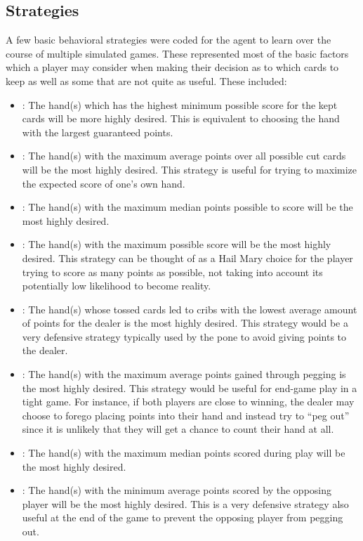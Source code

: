 
\subsection{Strategies}
\label{sec:dm-methods-strategies}


A few basic behavioral strategies were coded for the agent to learn
over the course of multiple simulated games.
%
These represented most of the basic factors which a player may consider when
making their decision as to which cards to keep
as well as some that are not quite as useful.
%
These included:
\begin{itemize}
\item \handmaxmin:
	The hand(s) which has the highest minimum possible score for the kept cards
	will be more highly desired.
	This is equivalent to choosing the hand with the largest guaranteed points.
\item \handmaxavg:
	The hand(s) with the maximum average points over all possible cut cards will
	be the most highly desired.
	This strategy is useful for trying to maximize the expected score of one's
	own hand.
\item \handmaxmed:
	The hand(s) with the maximum median points possible to score will be the most
	highly desired.
\item \handmaxposs:
	The hand(s) with the maximum possible score will be the most highly desired.
	This strategy can be thought of as a Hail Mary choice for the player trying
	to score as many points as possible, not taking into account its
	potentially low likelihood to become reality.
\item \cribminavg:
	The hand(s) whose tossed cards led to cribs with the lowest average amount
	of points for the dealer is
	the most highly desired.
	This strategy would be a very defensive strategy typically used by the pone
	to avoid giving points to the dealer.
\item \peggingmaxavggained:
	The hand(s) with the maximum average points gained through pegging is the most
	highly desired.
	This strategy would be useful for end-game play in a tight game.
	For instance, if both players are close to winning, the dealer may
	choose to forego placing points into their hand and instead try to
		``peg out''
	since it is unlikely that they will get a chance to count their hand at all.
\item \peggingmaxmedgained:
	The hand(s) with the maximum median points scored during play will be the most
	highly desired.
\item \peggingminavggiven:
	The hand(s) with the minimum average points scored by the opposing player
	will be the most highly desired.
	This is a very defensive strategy also useful at the end of the game to
	prevent the opposing player from pegging out.
\end{itemize}
